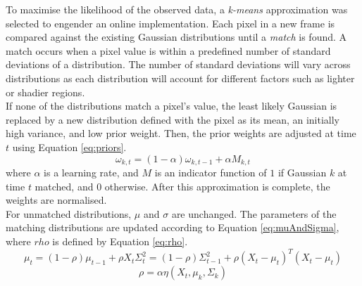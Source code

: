 \indent
To maximise the likelihood of the observed data, a \textit{k-means} approximation was selected to engender an online implementation. Each pixel in a new frame is compared against the existing Gaussian distributions until a \textit{match} is found. A match occurs when a pixel value is within a predefined number of standard deviations of a distribution. The number of standard deviations will vary across distributions as each distribution will account for different factors such as lighter or shadier regions. 
\smallskip \\ \indent
If none of the distributions match a pixel's value, the least likely Gaussian is replaced by a new distribution defined with the pixel as its mean, an initially high variance, and low prior weight. Then, the prior weights are adjusted at time $t$ using Equation \ref{eq:priors}.
\begin{equation}
    \label{eq:priors}
    \omega_{k,t} = (1-\alpha)\omega_{k,t-1} + \alpha M_{k,t}
\end{equation}
where $\alpha$ is a learning rate, and $M$ is an indicator function of $1$ if Gaussian $k$ at time $t$ matched, and $0$ otherwise. After this approximation is complete, the weights are normalised.
\smallskip \\ \indent
For unmatched distributions, $\mu$ and $\sigma$ are unchanged. The parameters of the matching distributions are updated according to Equation \ref{eq:muAndSigma}, where $rho$ is defined by Equation \ref{eq:rho}.
\begin{subequations}
    \label{eq:muAndSigma}
    \begin{equation}
        \mu_t = (1 - \rho) \mu_{t-1} + \rho X_t
    \end{equation}
    \begin{equation}
        \Sigma^2_t = (1 - \rho) \Sigma^2_{t-1} + \rho(X_t - \mu_t)^T(X_t - \mu_t)
    \end{equation}
\end{subequations}
\begin{equation}
    \label{eq:rho}
    \rho = \alpha \eta(X_t, \mu_k, \Sigma_k)
\end{equation}
